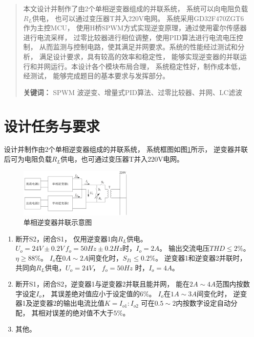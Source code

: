 \documentclass[a4paper,12pt]{article}
\begin{document}



\newpage
\begin{abstract}
本文设计并制作了由2个单相逆变器组成的并联系统，
系统可以向电阻负载$R_L$供电，
也可以通过变压器T并入220V电网。
系统采用GD32F470ZGT6作为主控MCU，
使用H桥SPWM方式实现逆变原理，通过使用霍尔传感器进行电流采样，
过零比较器进行相位调整，使用PID算法进行电流电压控制，
从而监测与控制电路，使其满足并网要求。系统的性能经过测试和分析，
满足设计要求，具有较高的效率和稳定性，
能够实现逆变器的并联运行和并网运行。本设计各个模块布局合理，
系统稳定性好，制作成本低，经测试，
能够完成题目的基本要求与发挥部分。


\noindent \textbf{关键词：} 
SPWM 波逆变、增量式PID算法、过零比较器、并网、LC滤波
\end{abstract}

\newpage

\tableofcontents

\newpage

\section{设计任务与要求}
设计并制作由2个单相逆变器组成的并联系统，
系统框图如图\ref{fig1}所示，
逆变器并联后可为电阻负载$R_L$供电，也可通过变压器T并入220V电网。
\begin{figure}[htbp]
\centering
\includegraphics[width=0.5\textwidth]{src/fig1.png}
\caption{单相逆变器并联示意图}
\label{fig1}
\end{figure}
\begin{enumerate}
    \item 断开S2，闭合S1，
    仅用逆变器1向$R_L$供电。$U_o=24V\pm0.2V\  f_o=50Hz\pm0.2Hz$时，$I_o=2A$。
    输出交流电压$THD\leqslant 2\%$。$\eta\geqslant 88\%$。
    $I_o$在$0A\sim 2A$间变化时，$S_{I1}\leqslant 0.2\%$。
    逆变器1和逆变器2并联时，
    共同向$R_L$供电，$U_o=24V$， $f_o=50Hz$ 时，$I_o=4A$。
    \item 断开S1，闭合S2，逆变器1与逆变器2并联且能并网，
    能在$2A\sim4A$范围内按数字设定$I_o$，
    其误差绝对值应小于设定值的$6\%$。
    $I_o$在$1A\sim 3A$间变化时，
    逆变器1及逆变器2的输出电流比值$K=I_{o1}:I_{o2}$
    可在$0.5\sim 2$内按数字设定自动分配，
    其相对误差的绝对值不大于$5\%$。
    \item 其他。
\end{enumerate}
\end{document}
